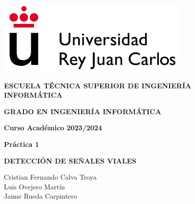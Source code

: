 \documentclass[a4paper, 12pt]{article}
\begin{document}
\begin{titlepage}
	\begin{center}
		\includegraphics[scale=0.9]{images.png}
		\vspace{1.75cm}
		
		\large
		\textbf{ESCUELA TÉCNICA SUPERIOR DE INGENIERÍA INFORMÁTICA}
		\vspace{1cm}
		
		\large
		\textbf{GRADO EN INGENIERÍA INFORMÁTICA}
		
		
		
		\large
		\textbf{Curso Académico 2023/2024}
		
		\vspace{1cm}
		\large
		\textbf{Práctica 1}
		
		\vspace{2cm}
		
		\large
		\textbf{DETECCIÓN DE SEÑALES VIALES}
		
		\vspace{2cm}
		
		\large
		Cristian Fernando Calva Troya \\
		Luis Ovejero Martín \\
		Jaime Rueda Carpintero
		\vspace{1cm}
	\end{center}
\end{titlepage}

\newpage
\thispagestyle{empty} 
\mbox{} 

\newpage
\newpage
\listoffigures
\newpage

{\small
	\tableofcontents 
}
\newpage

\end{document}
